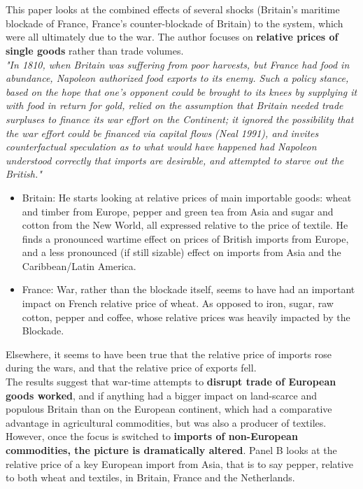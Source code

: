 \documentclass[12pt,a4paper,titlepage,english]{article}
\begin{document}
\section*{\cite{o2005worldwide}}
This paper looks at the combined effects of several shocks (Britain's maritime blockade of France, France's counter-blockade of Britain) to the system, which were all ultimately due to the war. The author focuses on \textbf{relative prices of single goods} rather than trade volumes.\\
\textit{"In 1810, when Britain was suffering from poor harvests, but France had food in abundance,
Napoleon authorized food exports to its enemy. Such a policy stance, based on the hope that
one's opponent could be brought to its knees by supplying it with food in return for gold,
relied on the assumption that Britain needed trade surpluses to finance its war effort on the Continent; it ignored the possibility that the war effort could be financed via capital flows (Neal 1991), and invites counterfactual speculation as to what would have happened had
Napoleon understood correctly that imports are desirable, and attempted to starve out the
British."} 
\begin{itemize}
\item{Britain: He starts looking at relative prices of main importable goods: wheat and timber from Europe, pepper and green tea from Asia and sugar and cotton from the New World, all expressed relative to the price of textile. He finds a pronounced wartime effect on prices of British imports from Europe, and a less pronounced (if still sizable) effect on imports from Asia and the Caribbean/Latin America.  }
\item{France: War, rather than the blockade itself, seems to have had an important impact on French relative price of wheat. As opposed to iron, sugar, raw cotton, pepper and coffee, whose relative prices was heavily impacted by the Blockade.}
\end{itemize}
Elsewhere, it seems to have been true that the relative price of imports rose during the wars, and that the relative price of exports fell. \\
The results suggest that war-time attempts to \textbf{disrupt trade of European goods worked}, and if anything had a bigger impact on land-scarce and populous Britain than on the European continent, which had a comparative advantage in agricultural commodities, but was also a producer of textiles. However, once the focus is switched to \textbf{imports of non-European commodities, the picture is dramatically altered}. Panel B looks at the relative price of a key European import from Asia, that is to say pepper, relative to both wheat and textiles, in Britain, France and the Netherlands. \\
\end{document}
